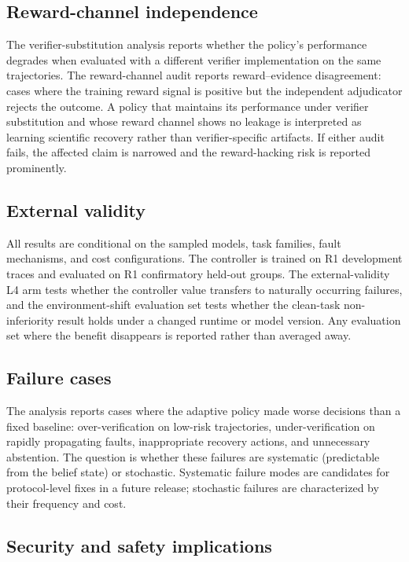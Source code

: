 \subsection{Reward-channel independence}

The verifier-substitution analysis reports whether the policy's performance
degrades when evaluated with a different verifier implementation on the same
trajectories. The reward-channel audit reports reward--evidence disagreement:
cases where the training reward signal is positive but the independent
adjudicator rejects the outcome. A policy that maintains its performance
under verifier substitution and whose reward channel shows no leakage is
interpreted as learning scientific recovery rather than verifier-specific
artifacts. If either audit fails, the affected claim is narrowed and the
reward-hacking risk is reported prominently.

\subsection{External validity}

All results are conditional on the sampled models, task families, fault
mechanisms, and cost configurations. The controller is trained on R1
development traces and evaluated on R1 confirmatory held-out groups. The
external-validity L4 arm tests whether the controller value transfers to
naturally occurring failures, and the environment-shift evaluation set
tests whether the clean-task non-inferiority result holds under a changed
runtime or model version. Any evaluation set where the benefit disappears
is reported rather than averaged away.

\subsection{Failure cases}

The analysis reports cases where the adaptive policy made worse decisions
than a fixed baseline: over-verification on low-risk trajectories,
under-verification on rapidly propagating faults, inappropriate recovery
actions, and unnecessary abstention. The question is whether these failures
are systematic (predictable from the belief state) or stochastic. Systematic
failure modes are candidates for protocol-level fixes in a future release;
stochastic failures are characterized by their frequency and cost.

\subsection{Security and safety implications}

